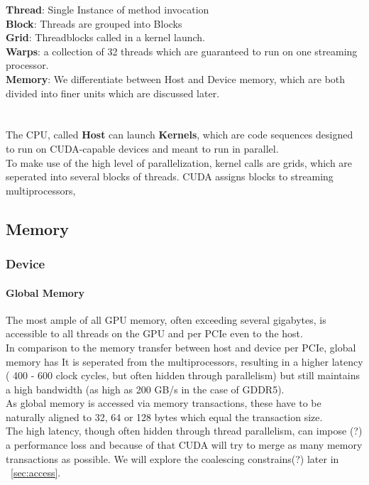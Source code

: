 \textbf{Thread}: Single Instance of method invocation\\
\textbf{Block}: Threads are grouped into Blocks\\
\textbf{Grid}: Threadblocks called in a kernel launch.\\
\textbf{Warps}: a collection of 32 threads which are guaranteed to run on one streaming processor.\\
\textbf{Memory}: We differentiate between Host and Device memory, which are both divided into finer units which are discussed later.\\
\\\\
The CPU, called \textbf{Host} can launch \textbf{Kernels}, which are code sequences designed to run on CUDA-capable devices and meant to run in parallel.\\ 
To make use of the high level of parallelization, kernel calls are grids, which are seperated into several blocks of threads.
CUDA assigns blocks to streaming multiprocessors, 
\subsection{Memory}
\subsubsection{Device}
\paragraph{Global Memory}
The most ample of all GPU memory, often exceeding several gigabytes, is accessible to all threads on the GPU and per PCIe even to the host.\\
In comparison to the memory transfer between host and device per PCIe, global memory has 
It is seperated from the multiprocessors, resulting in a higher latency ( 400 - 600 clock cycles, but often hidden through parallelism) but still maintains a high bandwidth (as high as 200 GB/s in the case of GDDR5).\\
As global memory is accessed via memory transactions, these have to be naturally aligned to 32, 64 or 128 bytes which equal the transaction size.\\
The high latency, though often hidden through thread parallelism, can impose (?) a performance loss and because of that CUDA will try to merge as many memory transactions as possible. We will explore the coalescing constrains(?) later in ~\ref{sec:access}.\\
